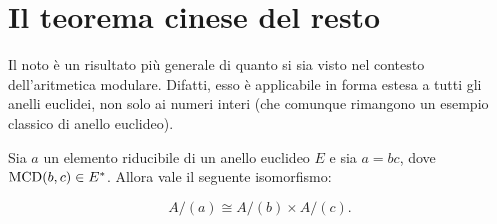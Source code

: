 \section{Il teorema cinese del resto}

    Il noto  è un risultato più generale di quanto
    si sia visto nel contesto dell'aritmetica modulare. Difatti, esso è
    applicabile in forma estesa a tutti gli anelli euclidei, non solo ai
    numeri interi (che comunque rimangono un esempio classico di anello euclideo). \\
    
    \begin{lemma}
        \label{lem:pre_cinese}

        Sia $a$ un elemento riducibile di un anello euclideo $E$ e
        sia $a=bc$, dove $\operatorname{MCD}(b, c) \in E^*$. Allora vale
        il seguente isomorfismo:
        
        \[ A/(a) \cong A/(b) \times A/(c). \]
    \end{lemma}
    
